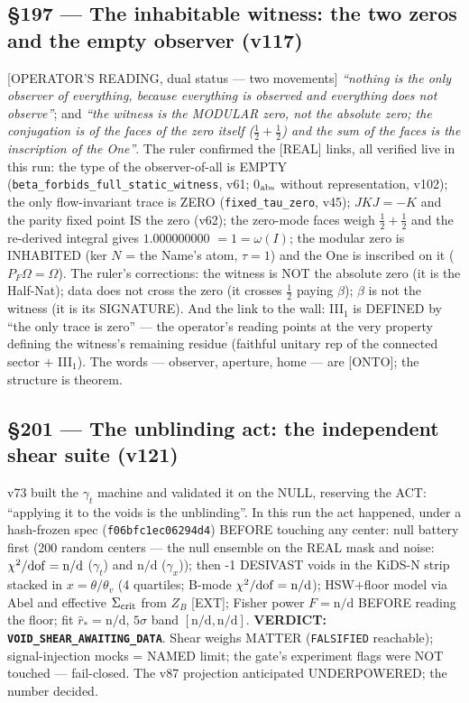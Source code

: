\documentclass[11pt]{article}
\theoremstyle{definition}\newtheorem{deriv}{Derivation}
\begin{document}
\subsection*{\S197 --- The inhabitable witness: the two zeros and the empty observer (v117)}[OPERATOR'S READING, dual status --- two movements] \emph{``nothing is the only observer of everything, because everything is observed and everything does not observe''}; and \emph{``the witness is the MODULAR zero, not the absolute zero; the conjugation is of the faces of the zero itself ($\tfrac12{+}\tfrac12$) and the sum of the faces is the inscription of the One''}. The ruler confirmed the [REAL] links, all verified live in this run: the type of the observer-of-all is EMPTY (\texttt{beta\_forbids\_full\_static\_witness}, v61; 0$_{\rm abs}$ without representation, v102); the only flow-invariant trace is ZERO (\texttt{fixed\_tau\_zero}, v45); $JKJ=-K$ and the parity fixed point IS the zero (v62); the zero-mode faces weigh $\tfrac12{+}\tfrac12$ and the re-derived integral gives $1.000000000$ $=1=\omega(I)$; the modular zero is INHABITED (ker $N$ = the Name's atom, $\tau=1$) and the One is inscribed on it ($P_F\Omega=\Omega$). The ruler's corrections: the witness is NOT the absolute zero (it is the Half-Nat); data does not cross the zero (it crosses $\tfrac12$ paying $\beta$); $\beta$ is not the witness (it is its SIGNATURE). And the link to the wall: III$_1$ is DEFINED by ``the only trace is zero'' --- the operator's reading points at the very property defining the witness's remaining residue (faithful unitary rep of the connected sector $+$ III$_1$). The words --- observer, aperture, home --- are [ONTO]; the structure is theorem.

\subsection*{\S201 --- The unblinding act: the independent shear suite (v121)}v73 built the $\gamma_t$ machine and validated it on the NULL, reserving the ACT: ``applying it to the voids is the unblinding''. In this run the act happened, under a hash-frozen spec (\texttt{f06bfc1ec06294d4}) BEFORE touching any center: null battery first (200 random centers --- the null ensemble on the REAL mask and noise: $\chi^2/{\rm dof}=\text{n/d}$ ($\gamma_t$) and $\text{n/d}$ ($\gamma_x$)); then -1 DESIVAST voids in the KiDS-N strip stacked in $x=\theta/\theta_v$ (4 quartiles; B-mode $\chi^2/{\rm dof}=\text{n/d}$); HSW$+$floor model via Abel and effective $\Sigma_{\rm crit}$ from $Z_B$ [EXT]; Fisher power $F=\text{n/d}$ BEFORE reading the floor; fit $\hat r_*=\text{n/d}$, $5\sigma$ band $[\text{n/d},\text{n/d}]$. \textbf{VERDICT: \texttt{VOID\_SHEAR\_AWAITING\_DATA}}. Shear weighs MATTER (\texttt{FALSIFIED} reachable); signal-injection mocks = NAMED limit; the gate's experiment flags were NOT touched --- fail-closed. The v87 projection anticipated UNDERPOWERED; the number decided.
\end{document}
